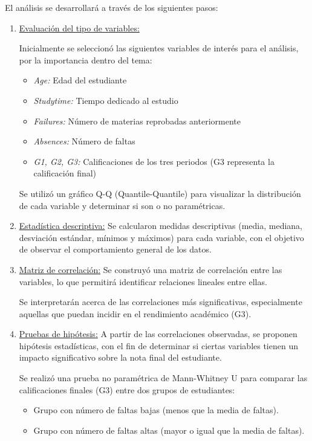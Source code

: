 \documentclass{article}
\begin{document}
El análisis se desarrollará a través de los siguientes pasos:
\begin{enumerate}
    \item \underline{{Evaluación del tipo de variables:}} 
    
    
    Inicialmente se seleccionó las siguientes variables de interés para el análisis, por la importancia dentro del tema:
    \begin{itemize}[label=\--] %
    \item \textit{Age:} Edad del estudiante
    \item \textit{Studytime:} Tiempo dedicado al estudio
    \item \textit{Failures:} Número de materias reprobadas anteriormente
    \item \textit{Absences:} Número de faltas
    \item \textit{G1, G2, G3:} Calificaciones de los tres periodos (G3 representa la calificación final)
    \end{itemize}
    
    Se utilizó un gráfico Q-Q (Quantile-Quantile) para visualizar la distribución de cada variable y determinar si son o no paramétricas.

    \item \underline{Estadística descriptiva:} Se calcularon medidas descriptivas (media, mediana, desviación estándar, mínimos y máximos) para cada variable, con el objetivo de observar el comportamiento general de los datos.

    \item \underline{Matriz de correlación:} Se construyó una matriz de correlación entre las variables, lo que permitirá identificar relaciones lineales entre ellas. 
    
    Se interpretarán acerca de las correlaciones más significativas, especialmente aquellas que puedan incidir en el rendimiento académico (G3).

    \item \underline{Pruebas de hipótesis:} A partir de las correlaciones observadas, se proponen hipótesis estadísticas, con el fin de determinar si ciertas variables tienen un impacto significativo sobre la nota final del estudiante.


    Se realizó una prueba no paramétrica de Mann-Whitney U para comparar las calificaciones finales (G3) entre dos grupos de estudiantes:
    \begin{itemize}[label=\--] %
    \item Grupo con número de faltas bajas (menos que la media de faltas).
    \item Grupo con número de faltas altas (mayor o igual que la media de faltas).
    \end{itemize}


\end{enumerate}
\end{document}
